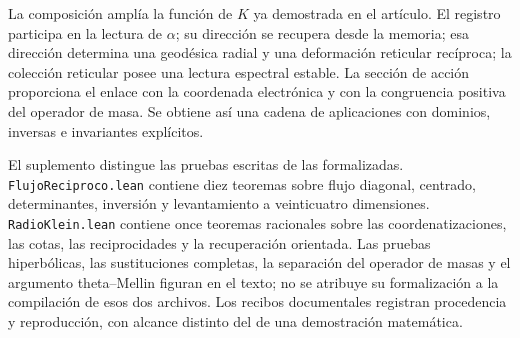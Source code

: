 La composición amplía la función de \(K\) ya demostrada en el artículo. El registro participa en la lectura de \(\alpha\); su dirección se recupera desde la memoria; esa dirección determina una geodésica radial y una deformación reticular recíproca; la colección reticular posee una lectura espectral estable. La sección de acción proporciona el enlace con la coordenada electrónica y con la congruencia positiva del operador de masa. Se obtiene así una cadena de aplicaciones con dominios, inversas e invariantes explícitos.

El suplemento distingue las pruebas escritas de las formalizadas. \texttt{FlujoReciproco.lean} contiene diez teoremas sobre flujo diagonal, centrado, determinantes, inversión y levantamiento a veinticuatro dimensiones. \texttt{RadioKlein.lean} contiene once teoremas racionales sobre las coordenatizaciones, las cotas, las reciprocidades y la recuperación orientada. Las pruebas hiperbólicas, las sustituciones completas, la separación del operador de masas y el argumento theta--Mellin figuran en el texto; no se atribuye su formalización a la compilación de esos dos archivos. Los recibos documentales registran procedencia y reproducción, con alcance distinto del de una demostración matemática.
